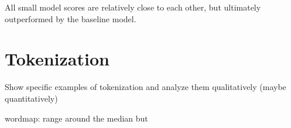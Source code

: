 All small model scores are relatively close to each other, but ultimately outperformed by the baseline model.


\section{Tokenization}
\label{sec:tokenization}
Show specific examples of tokenization and analyze them qualitatively (maybe quantitatively)


wordmap: range around the median but

